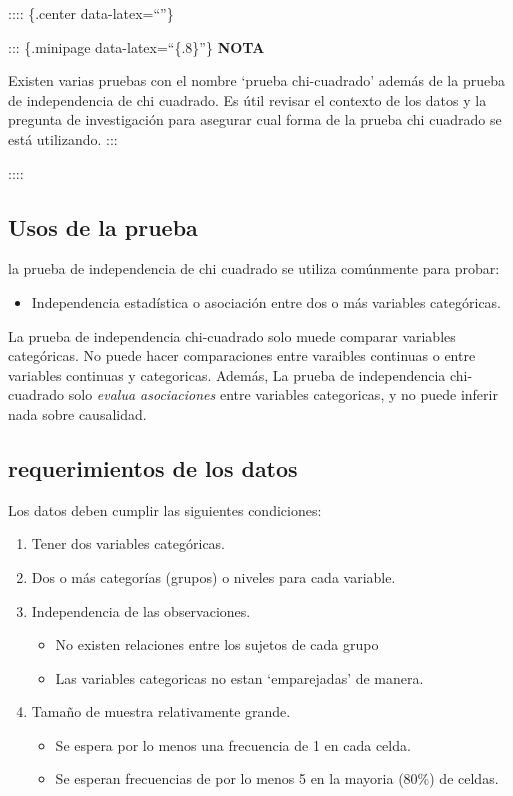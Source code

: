 \documentclass[twocolumn]{article}
\providecommand{\tightlist}{%
  \setlength{\itemsep}{0pt}\setlength{\parskip}{0pt}}
\begin{document}
:::: \{.center data-latex=``''\}

::: \{.minipage data-latex=``\{.8\linewidth\}''\} \textbf{NOTA}

Existen varias pruebas con el nombre `prueba chi-cuadrado' además de la
prueba de independencia de chi cuadrado. Es útil revisar el contexto de
los datos y la pregunta de investigación para asegurar cual forma de la
prueba chi cuadrado se está utilizando. :::

::::

\subsection{Usos de la prueba}\label{usos-de-la-prueba}

la prueba de independencia de chi cuadrado se utiliza comúnmente para
probar:

\begin{itemize}
\tightlist
\item
  Independencia estadística o asociación entre dos o más variables
  categóricas.
\end{itemize}

La prueba de independencia chi-cuadrado solo muede comparar variables
categóricas. No puede hacer comparaciones entre varaibles continuas o
entre variables continuas y categoricas. Además, La prueba de
independencia chi-cuadrado solo \emph{evalua asociaciones} entre
variables categoricas, y no puede inferir nada sobre causalidad.

\subsection{requerimientos de los
datos}\label{requerimientos-de-los-datos}

Los datos deben cumplir las siguientes condiciones:

\begin{enumerate}
\def\labelenumi{\arabic{enumi}.}
\tightlist
\item
  Tener dos variables categóricas.
\item
  Dos o más categorías (grupos) o niveles para cada variable.
\item
  Independencia de las observaciones.

  \begin{itemize}
  \tightlist
  \item
    No existen relaciones entre los sujetos de cada grupo
  \item
    Las variables categoricas no estan `emparejadas' de manera.
  \end{itemize}
\item
  Tamaño de muestra relativamente grande.

  \begin{itemize}
  \tightlist
  \item
    Se espera por lo menos una frecuencia de 1 en cada celda.
  \item
    Se esperan frecuencias de por lo menos 5 en la mayoria (80\%) de
    celdas.
  \end{itemize}
\end{enumerate}
\end{document}
